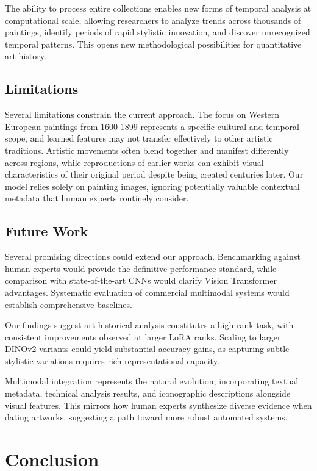 \documentclass[10pt,twocolumn,letterpaper]{article}
\begin{document}
The ability to process entire collections enables new forms of temporal analysis at computational scale, allowing researchers to analyze trends across thousands of paintings, identify periods of rapid stylistic innovation, and discover unrecognized temporal patterns. This opens new methodological possibilities for quantitative art history.

\subsection{Limitations}

Several limitations constrain the current approach. The focus on Western European paintings from 1600-1899 represents a specific cultural and temporal scope, and learned features may not transfer effectively to other artistic traditions. Artistic movements often blend together and manifest differently across regions, while reproductions of earlier works can exhibit visual characteristics of their original period despite being created centuries later. Our model relies solely on painting images, ignoring potentially valuable contextual metadata that human experts routinely consider.

\subsection{Future Work}

Several promising directions could extend our approach. Benchmarking against human experts would provide the definitive performance standard, while comparison with state-of-the-art CNNs would clarify Vision Transformer advantages. Systematic evaluation of commercial multimodal systems would establish comprehensive baselines.

Our findings suggest art historical analysis constitutes a high-rank task, with consistent improvements observed at larger LoRA ranks. Scaling to larger DINOv2 variants could yield substantial accuracy gains, as capturing subtle stylistic variations requires rich representational capacity.

Multimodal integration represents the natural evolution, incorporating textual metadata, technical analysis results, and iconographic descriptions alongside visual features. This mirrors how human experts synthesize diverse evidence when dating artworks, suggesting a path toward more robust automated systems.

\section{Conclusion}
\end{document}
